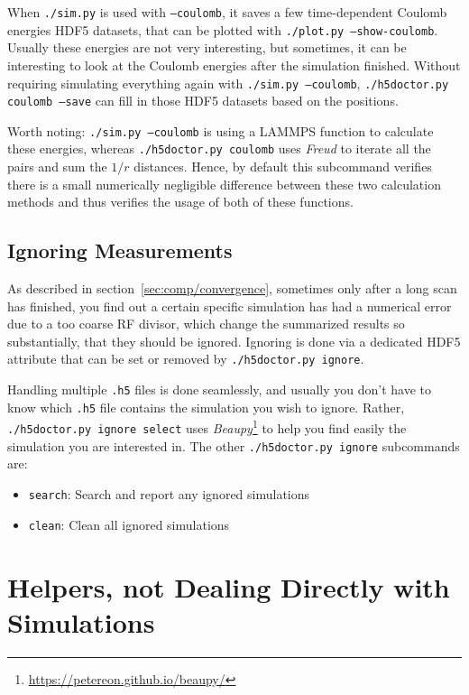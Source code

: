 When \texttt{./sim.py} is used with \texttt{--coulomb}, it saves a few time-dependent Coulomb energies HDF5 datasets, that can be plotted with \texttt{./plot.py --show-coulomb}. Usually these energies are not very interesting, but sometimes, it can be interesting to look at the Coulomb energies after the simulation finished. Without requiring simulating everything again with \texttt{./sim.py --coulomb}, \texttt{./h5doctor.py coulomb --save} can fill in those HDF5 datasets based on the positions.

Worth noting: \texttt{./sim.py --coulomb} is using a LAMMPS\cite{LAMMPS} function to calculate these energies, whereas \texttt{./h5doctor.py coulomb} uses \textit{Freud}\cite{freud} to iterate all the pairs and sum the $1/r$ distances. Hence, by default this subcommand verifies there is a small numerically negligible difference between these two calculation methods and thus verifies the usage of both of these functions.

\subsection{Ignoring Measurements}

As described in section~\ref{sec:comp/convergence}, sometimes only after a long scan has finished, you find out a certain specific simulation has had a numerical error due to a too coarse RF divisor, which change the summarized results so substantially, that they should be ignored. Ignoring is done via a dedicated HDF5 attribute that can be set or removed by \texttt{./h5doctor.py ignore}.

Handling multiple \texttt{.h5} files is done seamlessly, and usually you don't have to know which \texttt{.h5} file contains the simulation you wish to ignore. Rather, \texttt{./h5doctor.py ignore select} uses \textit{Beaupy}\footnote{\url{https://petereon.github.io/beaupy/}} to help you find easily the simulation you are interested in. The other \texttt{./h5doctor.py ignore} subcommands are:

\begin{itemize}
	\item \texttt{search}: Search and report any ignored simulations
	\item \texttt{clean}: Clean all ignored simulations
\end{itemize}

\section{Helpers, not Dealing Directly with Simulations}


